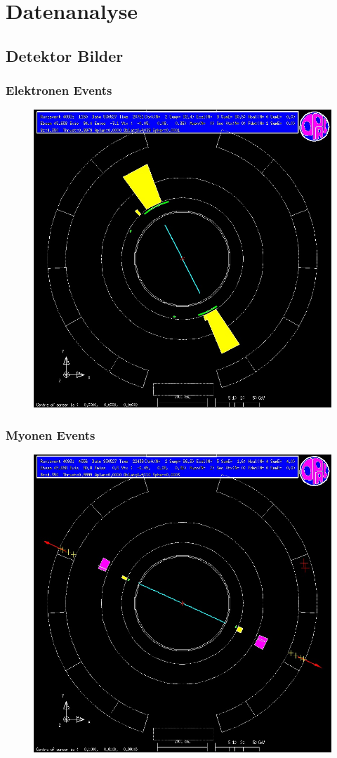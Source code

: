 \section{Datenanalyse}
\subsection{Detektor Bilder}
\begin{frame}
	\frametitle{Elektronen Events}
	\begin{figure}
		\centering
		\includegraphics[width=0.63\linewidth]{graphics/electronopal}
	\end{figure}
\end{frame}

\begin{frame}
	\frametitle{Myonen Events}
	\begin{figure}
		\centering
		\includegraphics[width=0.63\linewidth]{graphics/muonopal}
	\end{figure}
\end{frame}

